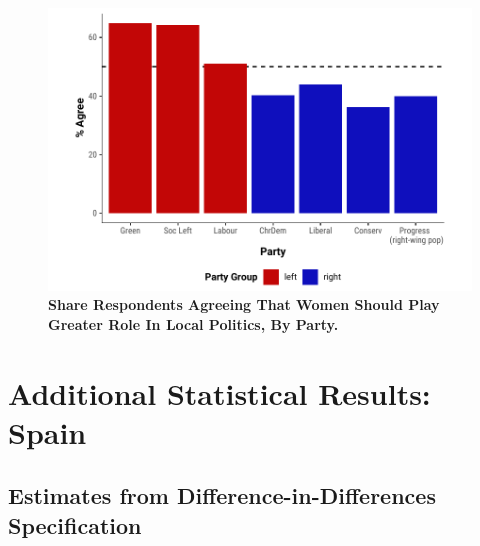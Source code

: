 \documentclass[12pt]{article}
\begin{document}
\begin{figure}[!htb]
    \centering
    \includegraphics[width = 1 \textwidth]{../output/figures/norway_survey_support.pdf}
    \caption{\textbf{Share Respondents Agreeing That Women Should Play Greater Role In Local Politics, By Party.}}
    \label{fig:norway_survey}
\end{figure}







\clearpage
\section{Additional Statistical Results: Spain}

\subsection{Estimates from Difference-in-Differences Specification}
\label{app:spain_did}
\end{document}
